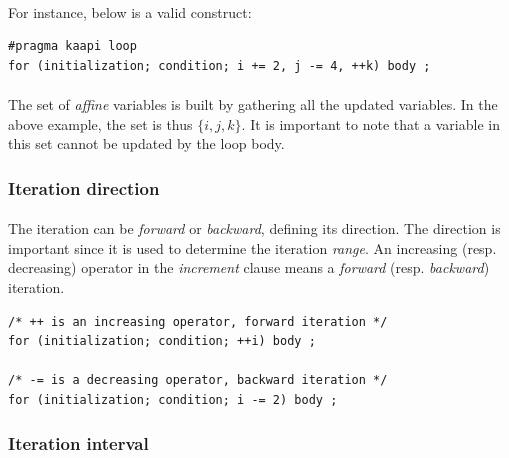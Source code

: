 \documentclass[a4paper, 11pt]{article}
\begin{document}
\paragraph{}
For instance, below is a valid construct:\\
\begin{small}
\lstset{language=C}
\begin{lstlisting}[frame=tb]
#pragma kaapi loop
for (initialization; condition; i += 2, j -= 4, ++k) body ;
\end{lstlisting}
\end{small}

\paragraph{}
The set of \textit{affine} variables is built by gathering all the updated variables. In the
above example, the set is thus $\{i, j, k\}$. It is important to note that a variable in this set
cannot be updated by the loop body.

\subsubsection{Iteration direction}
\paragraph{}
The iteration can be \textit{forward} or \textit{backward}, defining its direction. The direction
is important since it is used to determine the iteration \textit{range}. An increasing (resp. decreasing)
operator in the \textit{increment} clause means a \textit{forward} (resp. \textit{backward}) iteration.\\
\begin{small}
\lstset{language=C}
\begin{lstlisting}[frame=tb]
/* ++ is an increasing operator, forward iteration */
for (initialization; condition; ++i) body ;

/* -= is a decreasing operator, backward iteration */
for (initialization; condition; i -= 2) body ;
\end{lstlisting}
\end{small}

\subsubsection{Iteration interval}
\end{document}
